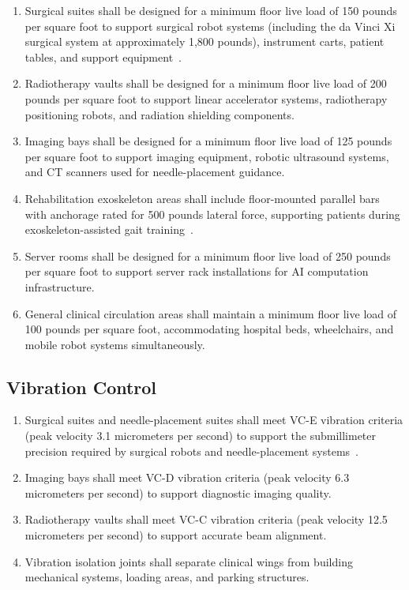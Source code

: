 \documentclass[11pt,letterpaper]{article}
\begin{document}
\begin{enumerate}[label=(\alph*)]
\item Surgical suites shall be designed for a minimum floor live load of 150
  pounds per square foot to support surgical robot systems (including the
  da Vinci Xi surgical system at approximately 1,800 pounds), instrument carts,
  patient tables, and support equipment~\cite{patientinstructions2026}.

\item Radiotherapy vaults shall be designed for a minimum floor live load of
  200 pounds per square foot to support linear accelerator systems,
  radiotherapy positioning robots, and radiation shielding components.

\item Imaging bays shall be designed for a minimum floor live load of 125
  pounds per square foot to support imaging equipment, robotic ultrasound
  systems, and CT scanners used for needle-placement guidance.

\item Rehabilitation exoskeleton areas shall include floor-mounted parallel
  bars with anchorage rated for 500 pounds lateral force, supporting patients
  during exoskeleton-assisted gait
  training~\cite{patientinstructions2026}.

\item Server rooms shall be designed for a minimum floor live load of 250
  pounds per square foot to support server rack installations for AI
  computation infrastructure.

\item General clinical circulation areas shall maintain a minimum floor live
  load of 100 pounds per square foot, accommodating hospital beds,
  wheelchairs, and mobile robot systems simultaneously.
\end{enumerate}

\subsection{Vibration Control}

\begin{enumerate}[label=(\alph*)]
\item Surgical suites and needle-placement suites shall meet VC-E vibration
  criteria (peak velocity 3.1 micrometers per second) to support the
  submillimeter precision required by surgical robots and needle-placement
  systems~\cite{newtrial2026}.

\item Imaging bays shall meet VC-D vibration criteria (peak velocity 6.3
  micrometers per second) to support diagnostic imaging quality.

\item Radiotherapy vaults shall meet VC-C vibration criteria (peak velocity
  12.5 micrometers per second) to support accurate beam alignment.

\item Vibration isolation joints shall separate clinical wings from building
  mechanical systems, loading areas, and parking structures.
\end{enumerate}
\end{document}
